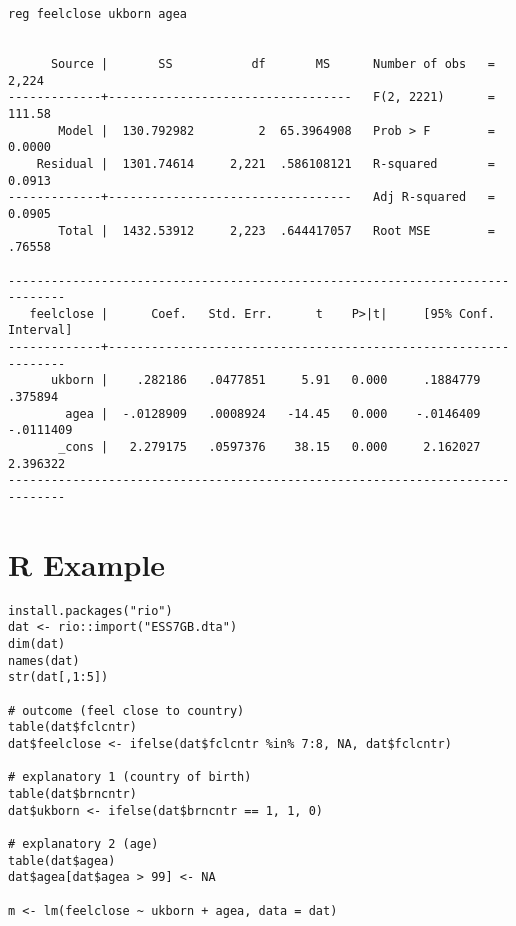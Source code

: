 \begin{frame}[fragile]

\tiny

\begin{verbatim}
reg feelclose ukborn agea


      Source |       SS           df       MS      Number of obs   =     2,224
-------------+----------------------------------   F(2, 2221)      =    111.58
       Model |  130.792982         2  65.3964908   Prob > F        =    0.0000
    Residual |  1301.74614     2,221  .586108121   R-squared       =    0.0913
-------------+----------------------------------   Adj R-squared   =    0.0905
       Total |  1432.53912     2,223  .644417057   Root MSE        =    .76558

------------------------------------------------------------------------------
   feelclose |      Coef.   Std. Err.      t    P>|t|     [95% Conf. Interval]
-------------+----------------------------------------------------------------
      ukborn |    .282186   .0477851     5.91   0.000     .1884779     .375894
        agea |  -.0128909   .0008924   -14.45   0.000    -.0146409   -.0111409
       _cons |   2.279175   .0597376    38.15   0.000     2.162027    2.396322
------------------------------------------------------------------------------
\end{verbatim}

\end{frame}



\section{R Example}
\frame{\tableofcontents[currentsection]}

\begin{frame}[fragile]

\footnotesize

\begin{verbatim}
install.packages("rio")
dat <- rio::import("ESS7GB.dta")
dim(dat)
names(dat)
str(dat[,1:5])

# outcome (feel close to country)
table(dat$fclcntr)
dat$feelclose <- ifelse(dat$fclcntr %in% 7:8, NA, dat$fclcntr)

# explanatory 1 (country of birth)
table(dat$brncntr)
dat$ukborn <- ifelse(dat$brncntr == 1, 1, 0)

# explanatory 2 (age)
table(dat$agea)
dat$agea[dat$agea > 99] <- NA

m <- lm(feelclose ~ ukborn + agea, data = dat)
\end{verbatim}

\end{frame}

